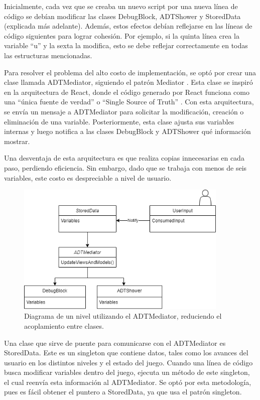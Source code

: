 Inicialmente, cada vez que se creaba un nuevo script por una nueva línea de código se debían modificar las clases DebugBlock, ADTShower y StoredData (explicada más adelante). Además, estos efectos debían reflejarse en las líneas de código siguientes para lograr cohesión. Por ejemplo, si la quinta línea crea la variable ``u'' y la sexta la modifica, esto se debe reflejar correctamente en todas las estructuras mencionadas.

Para resolver el problema del alto costo de implementación, se optó por crear una clase llamada ADTMediator, siguiendo el patrón Mediator \cite{Freeman2015TheMP}. Esta clase se inspiró en la arquitectura de React, donde el código generado por React funciona como una ``única fuente de verdad'' o ``Single Source of Truth'' \cite{ReactSingleSourceOfTruth}. Con esta arquitectura, se envía un mensaje a ADTMediator para solicitar la modificación, creación o eliminación de una variable. Posteriormente, esta clase ajusta sus variables internas y luego notifica a las clases DebugBlock y ADTShower qué información mostrar.

Una desventaja de esta arquitectura es que realiza copias innecesarias en cada paso, perdiendo eficiencia. Sin embargo, dado que se trabaja con menos de seis variables, este costo es despreciable a nivel de usuario.

\begin{figure}[h!]
	\centering
	\includegraphics[width=0.9\textwidth]{imagenes/ArquitecturaMediatorAfter.png}
	\caption{Diagrama de un nivel utilizando el ADTMediator, reduciendo el acoplamiento entre clases.}
	\label{ArquitecturaMediatorAfter}
\end{figure}

Una clase que sirve de puente para comunicarse con el ADTMediator es StoredData. Este es un singleton que contiene datos, tales como los avances del usuario en los distintos niveles y el estado del juego. Cuando una línea de código busca modificar variables dentro del juego, ejecuta un método de este singleton, el cual reenvía esta información al ADTMediator. Se optó por esta metodología, pues es fácil obtener el puntero a StoredData, ya que usa el patrón singleton.

